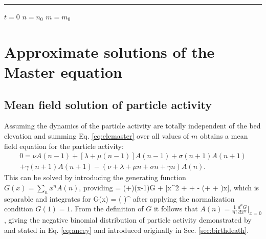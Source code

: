 \rule{\linewidth}{1pt}

\begin{algorithmic}
	\State $t = 0$ 
	\State $n = n_0$
	\State $m =  m_0$
	
	\EndWhile
\end{algorithmic}

\section{Approximate solutions of the Master equation}

\subsection{Mean field solution of particle activity}

Assuming the dynamics of the particle activity are totally independent of the bed elevation and summing Eq. \ref{eq:elemaster} over all values of $m$ obtains a mean field equation for the particle activity: 
\begin{multline} 0 = \nu A(n-1) + [\lambda + \mu(n-1)]A(n-1) + \sigma(n+1)A(n+1) \\
	+\gamma(n+1)A(n+1)-(\nu  + \lambda + \mu n + \sigma n + \gamma n)A(n).\end{multline}
This can be solved by introducing the generating function \citep{Cox1965} $G(x) = \sum_n x^n A(n)$, providing
 = (\nu+\lambda)(x-1)G + [\mu x^2 + \sigma + \gamma - (\mu + \sigma + \gamma)x],\ee
which is separable and integrates for 
\be G(x) = \Bigg( \Bigg)^{\frac{\nu + \lambda}{\mu}}\ee
after applying the normalization condition $G(1)=1$.
From the definition of $G$ it follows that $A(n) = \frac{1}{n!} \frac{d^nG}{dx^n}|_{x=0}$, giving the negative binomial distribution of particle activity demonstrated by \citet{Ancey2008} and stated in Eq. \ref{eq:ancey} and introduced originally in Sec. \ref{sec:birthdeath}.

